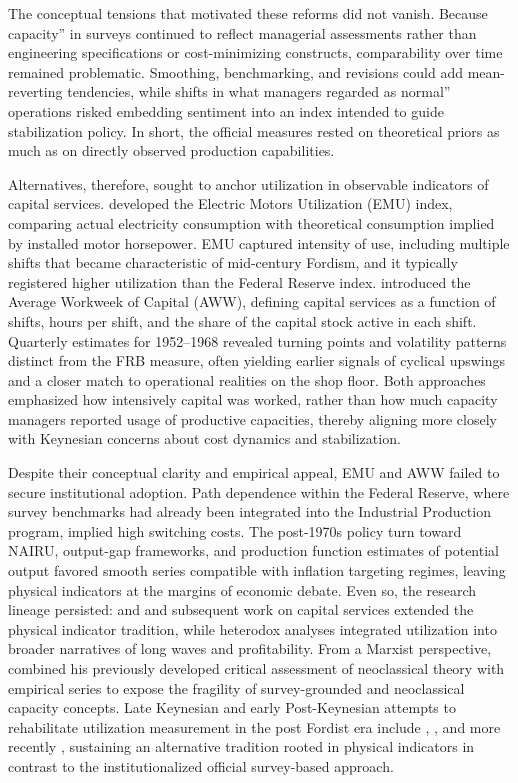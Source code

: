 \documentclass[11pt]{article}
\begin{document}
The conceptual tensions that motivated these reforms did not vanish. Because capacity'' in surveys continued to reflect managerial assessments rather than engineering specifications or cost-minimizing constructs, comparability over time remained problematic. Smoothing, benchmarking, and revisions could add mean-reverting tendencies, while shifts in what managers regarded as normal'' operations risked embedding sentiment into an index intended to guide stabilization policy. In short, the official measures rested on theoretical priors as much as on directly observed production capabilities.

Alternatives, therefore, sought to anchor utilization in observable indicators of capital services. \citet{foss1963} developed the Electric Motors Utilization (EMU) index, comparing actual electricity consumption with theoretical consumption implied by installed motor horsepower. EMU captured intensity of use, including multiple shifts that became characteristic of mid-century Fordism, and it typically registered higher utilization than the Federal Reserve index. \citet{taubmangottschalk1971} introduced the Average Workweek of Capital (AWW), defining capital services as a function of shifts, hours per shift, and the share of the capital stock active in each shift. Quarterly estimates for 1952--1968 revealed turning points and volatility patterns distinct from the FRB measure, often yielding earlier signals of cyclical upswings and a closer match to operational realities on the shop floor. Both approaches emphasized how intensively capital was worked, rather than how much capacity managers reported usage of productive capacities, thereby aligning more closely with Keynesian concerns about cost dynamics and stabilization.

Despite their conceptual clarity and empirical appeal, EMU and AWW failed to secure institutional adoption. Path dependence within the Federal Reserve, where survey benchmarks had already been integrated into the Industrial Production program, implied high switching costs. The post-1970s policy turn toward NAIRU, output-gap frameworks, and production function estimates of potential output favored smooth series compatible with inflation targeting regimes, leaving physical indicators at the margins of economic debate. Even so, the research lineage persisted: \citet{foss1981} and \citet{foss1985} and subsequent work on capital services extended the physical indicator tradition, while heterodox analyses integrated utilization into broader narratives of long waves and profitability. From a Marxist perspective, \citet{shaikh1992} combined his previously developed critical assessment of neoclassical theory \citep{shaikh1974} with empirical series to expose the fragility of survey-grounded and neoclassical capacity concepts. Late Keynesian and early Post-Keynesian attempts to rehabilitate utilization measurement in the post Fordist era include \citet{orr1989}, \citet{beaulieumattey1998}, and more recently \citet{nikiforos2016}, sustaining an alternative tradition rooted in physical indicators in contrast to the institutionalized official survey-based approach.
\end{document}
